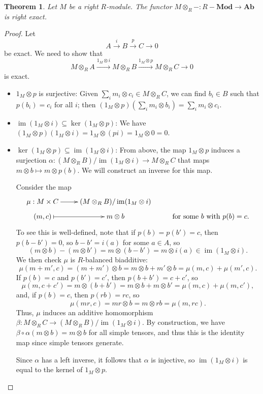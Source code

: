 \documentclass{amsart}[12pt]
\def\image{\operatorname{im}}
\def\im{\image}
\def\ker{\operatorname{ker}}
\numberwithin{equation}{section}
\theoremstyle{plain} %
\newtheorem{thm}[equation]{Theorem}
\theoremstyle{definition}
\theoremstyle{remark}
\newcommand{\xra}[1]{\xrightarrow{#1}}
\newcommand{\Ab}{\mathbf{Ab}}
\newcommand{\Mod}[1]{#1-\mathbf{Mod}}
\begin{document}
\begin{thm} Let $M$ be a right $R$-module. The functor $M \otimes_R - : \Mod{R} \to \Ab$ is right exact.
\end{thm}
\begin{proof} Let \[ A \xra{i} B \xra{p} C \to 0\]
be  exact. We need to show that
\[ M\otimes_R A \xra{1_M \otimes i}  M\otimes_R B \xra{1_M \otimes p} M\otimes_R C \to 0  \]
is exact.
\begin{itemize}
\item $1_M \otimes p$ is surjective: Given $\sum_i m_i \otimes c_i \in M\otimes_R C$, we can find $b_i\in B$ such that $p(b_i)=c_i$ for all $i$; then $(1_M \otimes p)(\sum_i m_i \otimes b_i)=\sum_i m_i \otimes c_i$.

\item $\im(1_M \otimes i)\subseteq \ker(1_M \otimes p)$: We have $(1_M \otimes p)(1_M \otimes i) = 1_M \otimes (pi) = 1_M \otimes 0 = 0$.

\item $\ker(1_M \otimes p)\subseteq \im(1_M \otimes i)$: From above, the map $1_M\otimes p$ induces a surjection $\alpha:(M\otimes_R B)/\im(1_M \otimes i) \to M\otimes_R C$ that maps $m\otimes b \mapsto m\otimes p(b)$. We will construct an inverse for this map.

Consider the map 
\[\xymatrix@R=.5em{\mu: M\times C \ar[r] & (M\otimes_R B)/\im(1_M \otimes i)& \\
(m,c) \ar@{|->}[r] & m\otimes b &\text{for some $b$ with $p(b)=c$.}}\]
To see this is well-defined, note that if $p(b)=p(b')=c$, then $p(b-b')=0$, so $b-b'=i(a)$ for some $a\in A$, so 
\[ (m\otimes b) - (m\otimes b') = m\otimes(b-b') =m\otimes i(a) \in \im(1_M\otimes i).\]
We then check $\mu$ is $R$-balanced biadditive:
\[ \mu(m+m',c)=(m+m')\otimes b = m\otimes b + m' \otimes b = \mu(m,c) + \mu(m',c).\]
If $p(b)=c$ and $p(b')=c'$, then $p(b+b')=c+c'$, so
\[ \mu(m,c+c')=m\otimes (b+b') = m\otimes b + m\otimes b' = \mu(m,c) + \mu(m,c'),\]
and, if $p(b)=c$, then $p(rb)=rc$, so
\[ \mu(mr, c) = mr\otimes b = m \otimes rb = \mu(m,rc).\]
Thus, $\mu$ induces an additive homomorphism $\beta:M\otimes_R C \to(M\otimes_R B)/\im(1_M \otimes i) $. By construction, we have $\beta\circ \alpha (m\otimes b) = m\otimes b$ for all simple tensors, and thus this is the identity map since simple tensors generate.

Since $\alpha$ has a left inverse, it follows that $\alpha$ is injective, so $\im(1_M \otimes i)$ is equal to the kernel of $1_M \otimes p$.\qedhere
\end{itemize}
\end{proof}
\end{document}

